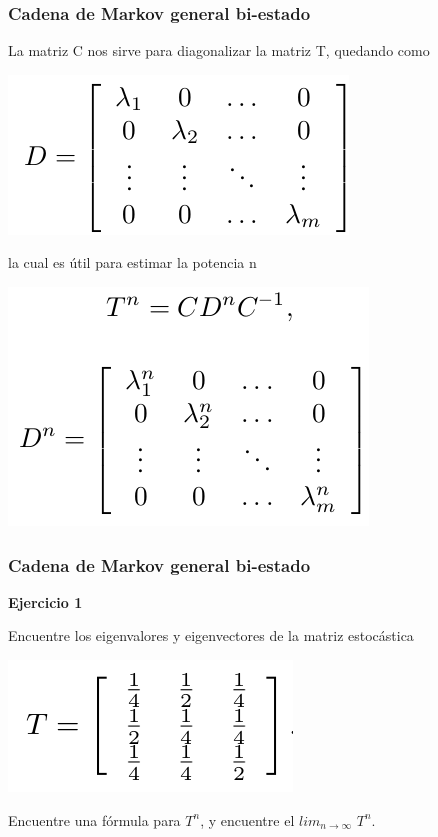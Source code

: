 \documentclass[spanish]{beamer}
\begin{document}
\begin{frame}
\frametitle{Cadena de Markov general bi-estado}
La matriz C nos sirve para diagonalizar la matriz T, quedando como 


\begin{center}
\includegraphics[scale=0.3]{im23}
\end{center}
la cual es útil para estimar la potencia n
\begin{center}
\includegraphics[scale=0.3]{im24}
\end{center}

\end{frame}
\begin{frame}
\frametitle{Cadena de Markov general bi-estado}
\textbf{Ejercicio 1}

Encuentre los eigenvalores y eigenvectores de la matriz estocástica 

\begin{center}
\includegraphics[scale=0.3]{im25}
\end{center}

Encuentre una fórmula para $T^{n}$, y encuentre el $lim_{n\rightarrow \infty}$ $T^{n}$.
\end{frame}
\end{document}
